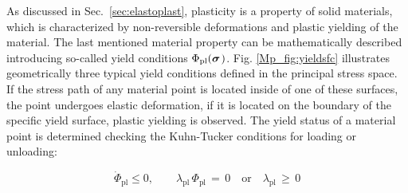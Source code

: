 As discussed in Sec.~\ref{sec:elastoplast}, plasticity is a property of solid materials, which is characterized by non-reversible deformations and plastic yielding of the material. The last mentioned material property can be mathematically described introducing so-called yield conditions $\Phi_{\mathrm{pl}}(\mbox{${\mbox{\boldmath${\sigma}$\unboldmath}}_{\:\!}$})$. Fig. \ref{Mp_fig:yieldsfc} illustrates geometrically three typical yield conditions defined in the principal stress space. If the stress path of any material point is located inside of one of these surfaces, the point undergoes elastic deformation, if it is located on the boundary of the specific yield surface, plastic yielding is observed. The yield status of a material point is determined checking the Kuhn-Tucker conditions for loading or unloading:

\begin{equation}
{\dot{\Phi}}_{\mathrm{pl}} \leq 0, \qquad 
\lambda_{\mathrm{pl}}\,{\Phi_{\mathrm{pl}}}\,=\,0 \quad\mbox{or}\quad
\lambda_{\mathrm{pl}}\,\geq\,0
\label{Mp_kuhn_tucker}
\end{equation}

